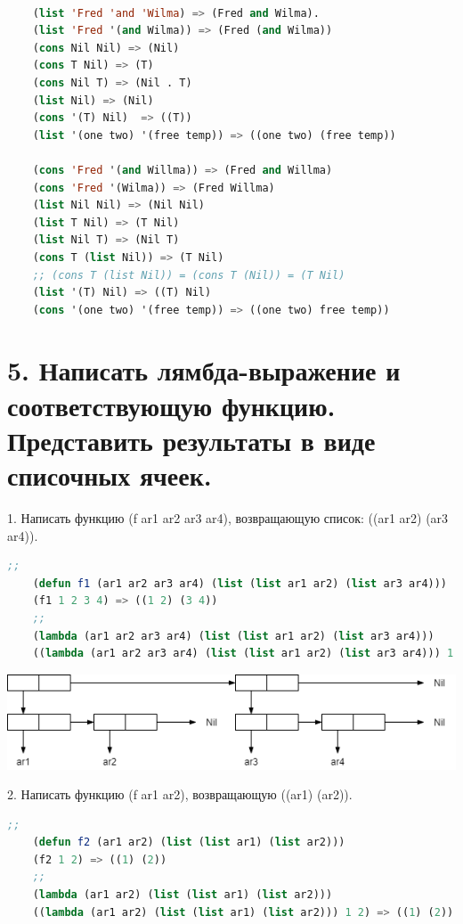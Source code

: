 \documentclass[12pt]{report}
\begin{document}
	
\clearpage

\begin{lstlisting}[language=Lisp]

	(list 'Fred 'and 'Wilma) => (Fred and Wilma). 
	(list 'Fred '(and Wilma)) => (Fred (and Wilma))
	(cons Nil Nil) => (Nil)
	(cons T Nil) => (T)
	(cons Nil T) => (Nil . T)
	(list Nil) => (Nil)
	(cons '(T) Nil)	 => ((T))
	(list '(one two) '(free temp)) => ((one two) (free temp))
	
	(cons 'Fred '(and Willma)) => (Fred and Willma)
	(cons 'Fred '(Wilma)) => (Fred Willma)
	(list Nil Nil) => (Nil Nil)
	(list T Nil) => (T Nil)
	(list Nil T) => (Nil T)
	(cons T (list Nil)) => (T Nil)
	;; (cons T (list Nil)) = (cons T (Nil))	= (T Nil)
	(list '(T) Nil) => ((T) Nil)
	(cons '(one two) '(free temp)) => ((one two) free temp))
\end{lstlisting}

\section*{5. Написать лямбда-выражение и соответствующую функцию. Представить результаты в виде списочных ячеек.}


1. Написать функцию (f ar1 ar2 ar3 ar4), возвращающую список: ((ar1 ar2) (ar3 ar4)).
\begin{lstlisting}[language=Lisp]
	;; 
	(defun f1 (ar1 ar2 ar3 ar4) (list (list ar1 ar2) (list ar3 ar4)))
	(f1 1 2 3 4) => ((1 2) (3 4))
	;; 
	(lambda (ar1 ar2 ar3 ar4) (list (list ar1 ar2) (list ar3 ar4)))
	((lambda (ar1 ar2 ar3 ar4) (list (list ar1 ar2) (list ar3 ar4))) 1 2 3 4) => ((1 2) (3 4))
\end{lstlisting}

%

\includegraphics[scale=0.7]{img/1}

2. Написать функцию (f ar1 ar2), возвращающую ((ar1) (ar2)).
\begin{lstlisting}[language=Lisp]
	;;
	(defun f2 (ar1 ar2) (list (list ar1) (list ar2)))
	(f2 1 2) => ((1) (2))
	;;
	(lambda (ar1 ar2) (list (list ar1) (list ar2)))
	((lambda (ar1 ar2) (list (list ar1) (list ar2))) 1 2) => ((1) (2))
\end{lstlisting}
\end{document}
